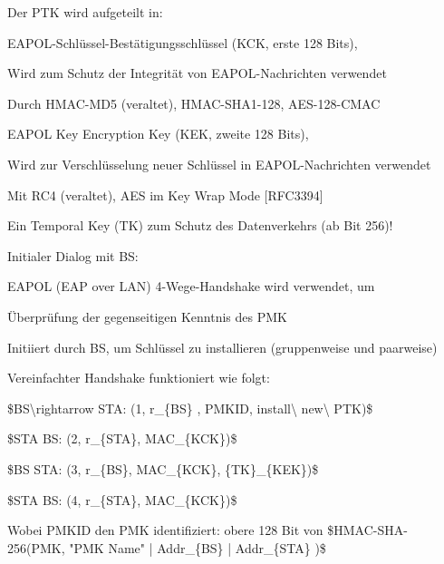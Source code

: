 \documentclass[a4paper]{article}
\begin{document}
\begin{multicols}{3}
\begin{itemize*}
            \item Der PTK wird aufgeteilt in:
            \begin{itemize*}
                  \item EAPOL-Schlüssel-Bestätigungsschlüssel (KCK, erste 128 Bits),
                  \begin{itemize*} \item Wird zum Schutz der Integrität von EAPOL-Nachrichten verwendet \item Durch HMAC-MD5 (veraltet), HMAC-SHA1-128, AES-128-CMAC \end{itemize*}
                  \item EAPOL Key Encryption Key (KEK, zweite 128 Bits),
                  \begin{itemize*} \item Wird zur Verschlüsselung neuer Schlüssel in EAPOL-Nachrichten verwendet \item Mit RC4 (veraltet), AES im Key Wrap Mode {[}RFC3394{]} \end{itemize*}
                  \item Ein Temporal Key (TK) zum Schutz des Datenverkehrs (ab Bit 256)!
            \end{itemize*}
            \item Initialer Dialog mit BS:
            \begin{itemize*}
                  \item EAPOL (EAP over LAN) 4-Wege-Handshake wird verwendet, um
                  \begin{itemize*} \item Überprüfung der gegenseitigen Kenntnis des PMK \item Initiiert durch BS, um Schlüssel zu installieren (gruppenweise und paarweise) \end{itemize*}
                  \item Vereinfachter Handshake funktioniert wie folgt:
                  \begin{enumerate*} \def\labelenumi{\arabic{enumi}.} \item \$BS\textbackslash rightarrow STA: (1, r\_\{BS\} , PMKID, install\textbackslash{} new\textbackslash{} PTK)\$ \item \$STA BS: (2, r\_\{STA\}, MAC\_\{KCK\})\$ \item \$BS STA: (3, r\_\{BS\}, MAC\_\{KCK\}, \{TK\}\_\{KEK\})\$ \item \$STA BS: (4, r\_\{STA\}, MAC\_\{KCK\})\$ \end{enumerate*}
                  \item Wobei PMKID den PMK identifiziert: obere 128 Bit von \$HMAC-SHA-256(PMK, "PMK Name" \textbar| Addr\_\{BS\} \textbar| Addr\_\{STA\} )\$
            \end{itemize*}
      \end{itemize*}



\end{multicols}
\end{document}
